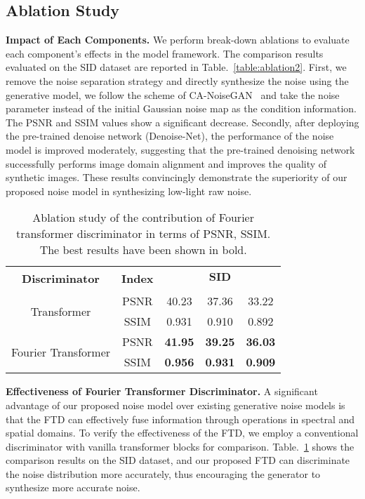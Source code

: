 \documentclass[10pt,twocolumn,letterpaper]{article}
\begin{document}
\vspace{-0.5em}
\subsection{Ablation Study}
\label{ablation}
\vspace{-0.5em}
\textbf{Impact of Each Components.} We perform break-down ablations to evaluate each component's effects in the model framework. The comparison results evaluated on the SID dataset are reported in Table.~\ref{table:ablation2}. First, we remove the noise separation strategy and directly synthesize the noise using the generative model, we follow the scheme of CA-NoiseGAN~\cite{chang2020learning} and take the noise parameter instead of the initial Gaussian noise map as the condition information. The PSNR and SSIM values show a significant decrease. Secondly, after deploying the pre-trained denoise network (Denoise-Net), the performance of the noise model is improved moderately, suggesting that the pre-trained denoising network successfully performs image domain alignment and improves the quality of synthetic images. These results convincingly demonstrate the superiority of our proposed noise model in synthesizing low-light raw noise.

\begin{table}[t]
\centering
\caption{Ablation study of the contribution of Fourier transformer discriminator in terms of PSNR, SSIM. The best results have been shown in bold.}
\vspace{2pt}
\begin{tabular}{c|c|c|c|c}
\hline
\multirow{2}{*}{\textbf{Discriminator}} & \multirow{2}{*}{\textbf{Index}} & \multicolumn{3}{c}{\textbf{SID}} \\\cline{3-5}
& & \textbf{} & \textbf{} & \textbf{} \\ \hline
\multirow{2}{*}{Transformer} & PSNR &40.23 &37.36 &33.22 \\ \cline{2-5}
& SSIM &0.931 &0.910 &0.892\\\hline
\multirow{2}{*}{Fourier Transformer} & PSNR &\textbf{41.95} &\textbf{39.25} &\textbf{36.03} \\ \cline{2-5}
& SSIM &\textbf{0.956} &\textbf{0.931} &\textbf{0.909}\\\hline
\end{tabular}
\label{table:ablation1}
\vspace{-2ex}
\end{table}

\textbf{Effectiveness of Fourier Transformer Discriminator.} A significant advantage of our proposed noise model over existing generative noise models is that the FTD can effectively fuse information through operations in spectral and spatial domains. To verify the effectiveness of the FTD, we employ a conventional discriminator with vanilla transformer blocks for comparison. Table.~\ref{table:ablation1} shows the comparison results on the SID dataset, and our proposed FTD can discriminate the noise distribution more accurately, thus encouraging the generator to synthesize more accurate noise.
\end{document}
